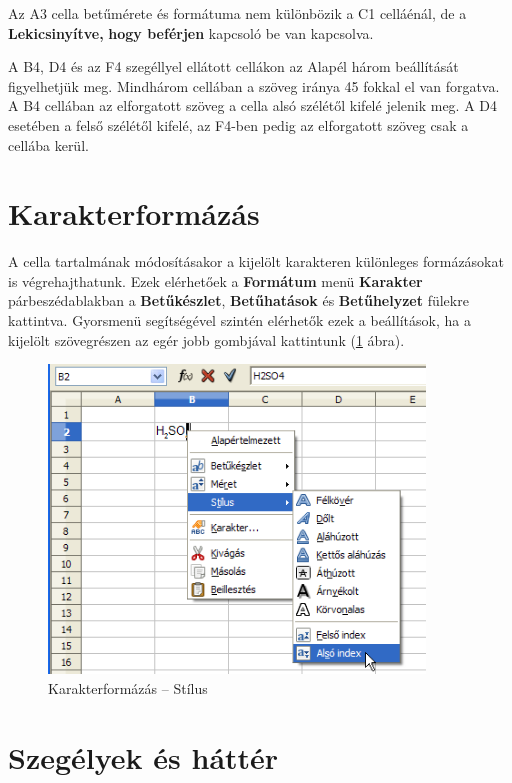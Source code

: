 Az A3 cella betűmérete és formátuma nem különbözik a C1
celláénál, de a \textbf{Lekicsinyítve, }\textbf{hogy
beférjen} kapcsoló be van kapcsolva.

A B4, D4 és az F4 szegéllyel ellátott cellákon az Alapél
három beállítását figyelhetjük meg. Mindhárom cellában
a szöveg iránya 45 fokkal el van forgatva. A B4 cellában az
elforgatott szöveg a cella alsó szélétől kifelé jelenik
meg. A D4 esetében a felső szélétől kifelé, az F4-ben
pedig az elforgatott szöveg csak a cellába kerül.


\section{Karakterformázás}

A cella tartalmának módosításakor a kijelölt karakteren
különleges formázásokat is végrehajthatunk. Ezek
elérhetőek a \textbf{Formátum} menü \textbf{Karakter}
párbeszédablakban a  \textbf{Betűkészlet},
\textbf{Betűhatások} és \textbf{Betűhelyzet} fülekre
kattintva. Gyorsmenü segítségével szintén elérhetők
ezek a beállítások, ha a kijelölt szövegrészen az egér
jobb gombjával kattintunk (\ref{KarakterStílus} ábra).

\begin{figure}[!h]
\begin{center}
\includegraphics[width=10.005cm]{oocalcv1-img14.png}
\caption{Karakterformázás --  Stílus}\label{KarakterStílus}
\end{center}
\end{figure}

\section{Szegélyek és háttér}

